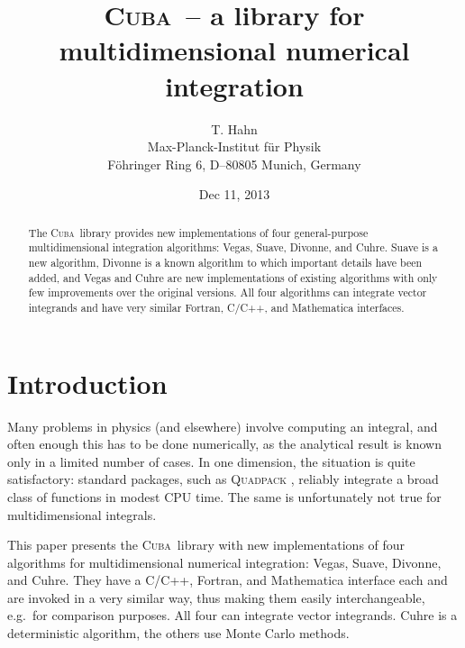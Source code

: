 \documentclass[12pt]{article}
\makeatletter
\newcommand\cuba{\textsc{Cuba}}
\newcommand\eg{e.g.\ }
\def\reportno#1{\gdef\@reportno{#1}}
\makeatother
\begin{document}
\reportno{MPP--2004--40\\hep--ph/0404043}

\title{\cuba\ -- a library for multidimensional numerical integration}

\author{T. Hahn \\
Max-Planck-Institut f\"ur Physik \\
F\"ohringer Ring 6, D--80805 Munich, Germany}

\date{Dec 11, 2013}

\maketitle

\begin{abstract}
The \cuba\ library provides new implementations of four general-purpose
multidimensional integration algorithms: Vegas, Suave, Divonne, and
Cuhre.  Suave is a new algorithm, Divonne is a known algorithm to which
important details have been added, and Vegas and Cuhre are new
implementations of existing algorithms with only few improvements over
the original versions.  All four algorithms can integrate vector
integrands and have very similar Fortran, C/C++, and Mathematica
interfaces.
\end{abstract}


\section{Introduction}

Many problems in physics (and elsewhere) involve computing an integral,
and often enough this has to be done numerically, as the analytical
result is known only in a limited number of cases.  In one dimension,
the situation is quite satisfactory: standard packages, such as
\textsc{Quadpack} \cite{quadpack}, reliably integrate a broad class of
functions in modest CPU time.  The same is unfortunately not true for
multidimensional integrals.

This paper presents the \cuba\ library with new implementations of four
algorithms for multidimensional numerical integration: Vegas, Suave,
Divonne, and Cuhre.  They have a C/C++, Fortran, and Mathematica
interface each and are invoked in a very similar way, thus making them
easily interchangeable, \eg for comparison purposes.  All four can
integrate vector integrands.  Cuhre is a deterministic algorithm, the
others use Monte Carlo methods.
\end{document}
